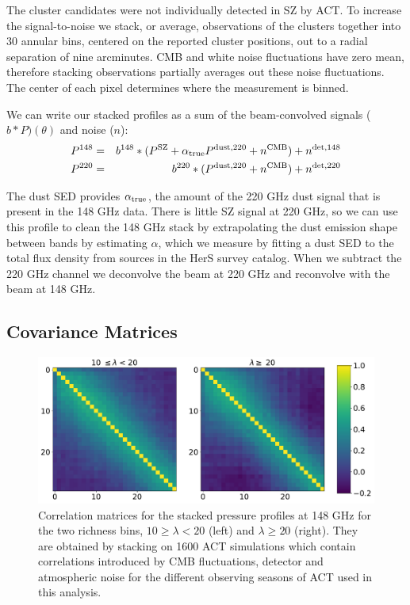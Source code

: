 \documentclass[a4paper,fleqn,usenatbib]{mnras}
\begin{document}
The cluster candidates were not individually detected in SZ by ACT. To increase the signal-to-noise we stack, or average, observations of the clusters together into 30 annular bins, centered on the reported cluster positions, out to a radial separation of nine arcminutes. CMB and white noise fluctuations have zero mean, therefore stacking observations partially averages out these noise fluctuations. The center of each pixel determines where the measurement is binned.

We can write our stacked profiles as a sum of the beam-convolved signals ($b \ast P)(\theta)$ and noise ($n$):
\begin{eqnarray}
  \label{eq:prof148}
  P^{148} &=& b^{148} \ast ( P^{\rm SZ} + \alpha_{\rm true} P^{\rm dust,220} + n^{\rm CMB} ) + n^{\rm det,148}  \\
  \label{eq:prof220}
  P^{220} &=& b^{220} \ast ( P^{\rm dust,220} + n^{\rm CMB} ) + n^{\rm det,220}
\end{eqnarray}

The dust SED provides $\alpha_{\rm true}$, the amount of the 220 GHz dust signal that is present in the 148 GHz data.
There is little SZ signal at 220 GHz, so we can use this profile to clean the 148 GHz stack by extrapolating the dust emission shape between bands by estimating $\alpha$, which we measure by fitting a dust SED to the total flux density from sources in the HerS survey catalog. When we subtract the 220 GHz channel we deconvolve the beam at 220 GHz and reconvolve with the beam at 148 GHz.

\subsection{Covariance Matrices}

\begin{figure}
\centering
  \includegraphics[width=\columnwidth]{correlation_1600_coadd_act_actpol_148_tophat_both.pdf}
  \caption{Correlation matrices for the stacked pressure profiles at 148 GHz for the two richness bins, $10 \geq \lambda < 20$ (left) and $\lambda \geq 20$ (right). They are obtained by stacking on 1600 ACT simulations which contain correlations introduced by CMB fluctuations, detector and atmospheric noise for the different observing seasons of ACT used in this analysis.}
  \label{fig:covariance}
\end{figure}
\end{document}
